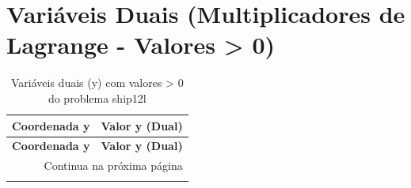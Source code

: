 \documentclass[12pt]{article}
\begin{document}
\section{Variáveis Duais (Multiplicadores de Lagrange - Valores > 0)}

\begin{longtable}{@{}cc@{}}
\caption{Variáveis duais (y) com valores > 0 do problema ship12l} \\
\toprule
\textbf{Coordenada y} & \textbf{Valor y (Dual)} \\
\midrule
\endfirsthead

\toprule
\textbf{Coordenada y} & \textbf{Valor y (Dual)} \\
\midrule
\endhead

\midrule \multicolumn{2}{r}{{Continua na próxima página}} \\ \midrule
\endfoot


\end{longtable}
\end{document}
